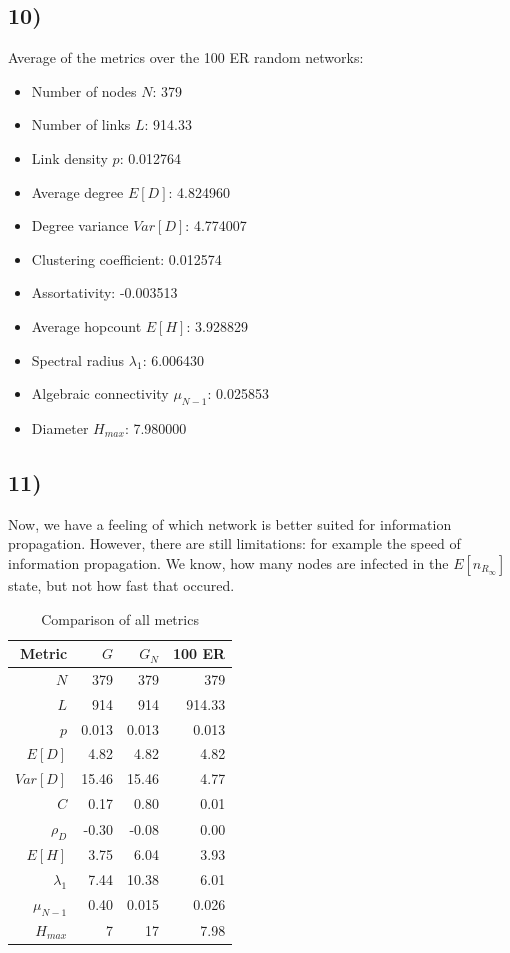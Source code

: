 \documentclass{article}
\begin{document}
\subsection*{10)}
Average of the metrics over the 100 ER random networks:
\begin{itemize}
 \item Number of nodes $N$: 379
 \item Number of links $L$: 914.33
 \item Link density $p$: 0.012764
 \item Average degree $E[D]$: 4.824960
 \item Degree variance $Var[D]$: 4.774007
 \item Clustering coefficient: 0.012574
 \item Assortativity: -0.003513
 \item Average hopcount $E[H]$: 3.928829
 \item Spectral radius $\lambda_1$: 6.006430
 \item Algebraic connectivity $\mu_{N-1}$: 0.025853
 \item Diameter $H_{max}$: 7.980000
\end{itemize}

\subsection*{11)}


Now, we have a feeling of which network is better suited for
information propagation.  However, there are still limitations: for
example the speed of information propagation. We know, how many nodes
are infected in the $E[n_{R_\infty}]$ state, but not how fast that
occured.

\begin{table}[H]
  \centering
  \begin{tabular}{r|rrr}
    \toprule
Metric      & $G$   & $G_N$ & 100 ER \\
\midrule
$N$         & 379   & 379   & 379    \\
$L$         & 914   & 914   & 914.33 \\
$p$         & 0.013 & 0.013 & 0.013  \\
$E[D]$      & 4.82  & 4.82  & 4.82   \\
$Var[D]$    & 15.46 & 15.46 & 4.77   \\
$C$         & 0.17  & 0.80  & 0.01  \\
$\rho_D$    & -0.30 & -0.08 & 0.00   \\
$E[H]$      & 3.75  & 6.04  & 3.93   \\
$\lambda_1$ & 7.44  & 10.38 & 6.01   \\
$\mu_{N-1}$ & 0.40  & 0.015 & 0.026  \\
$H_{max}$   & 7     & 17    & 7.98   \\
\bottomrule
  \end{tabular}
  \caption{Comparison of all metrics}
\end{table}
\end{document}
